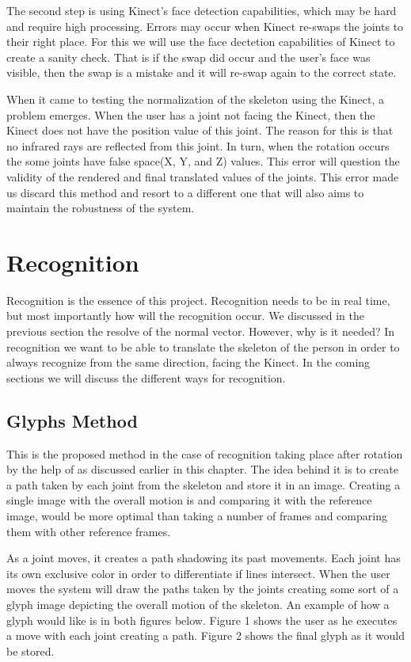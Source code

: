 The second step is using Kinect's face detection capabilities, which may be 
hard and require high processing. Errors may occur when Kinect re-swaps the joints to their right place. For this we will use the face dectetion capabilities of Kinect to create a sanity check. That is if the swap did occur and the user's face was visible, then the swap is a mistake and it will re-swap again to the correct state.

When it came to testing the normalization of the skeleton using the Kinect, a problem emerges. When the user has a joint not facing the Kinect, then the Kinect does not have the position value of this joint. The reason for this is that no infrared rays are reflected from this joint. In turn, when the rotation occurs the some joints have false space(X, Y, and Z) values. This error will question the validity of the rendered and final translated values of the joints. This error made us discard this method and resort to a different one that will also aims to maintain the robustness of the system.

\section{Recognition}
Recognition is the essence of this project. Recognition needs to be in real time, but most importantly how will the recognition occur. We discussed in the previous section the resolve of the normal vector. However, why is it needed? In recognition we want to be able to translate the skeleton of the person in order to always recognize from the same direction, facing the Kinect. In the coming sections we will discuss the different ways for recognition.

\subsection{Glyphs Method}
This is the proposed method in the case of recognition taking place after rotation by the help of \N as discussed earlier in this chapter. The idea behind it is to create a path taken by each joint from the skeleton and store it in an image. Creating a single image with the overall motion is and comparing it with the reference image, would be more optimal than taking a number of frames and comparing them with other reference frames.

As a joint moves, it creates a path shadowing its past movements. Each joint has its own exclusive color in order to differentiate if lines intersect. When the user moves the system will draw the paths taken by the joints creating some sort of a glyph image depicting the overall motion of the skeleton. An example of how a glyph would like is in both figures below. Figure 1 shows the user as he executes a move with each joint creating a path. Figure 2 shows the final glyph as it would be stored.

